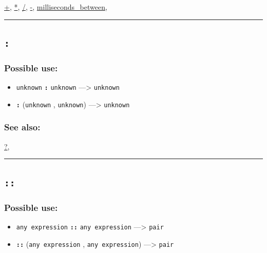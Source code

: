 \documentclass[]{book}
\providecommand{\tightlist}{%
  \setlength{\itemsep}{0pt}\setlength{\parskip}{0pt}}
\theoremstyle{definition}
\theoremstyle{definition}
\theoremstyle{definition}
\theoremstyle{remark}
\begin{document}
\href{operators-a-to-a.html\#+}{+}, \href{operators-a-to-a.html\#*}{*},
\href{operators-a-to-a.html\#/}{/}, \href{operators-a-to-a.html\#-}{-},
\href{operators-i-to-m.html\#milliseconds_between}{milliseconds\_between},

\begin{center}\rule{0.5\linewidth}{\linethickness}\end{center}

\subsection{\texorpdfstring{\texttt{:}}{:}}\label{section-1}

\subsubsection{Possible use:}\label{possible-use-1}

\begin{itemize}
\tightlist
\item
  \texttt{unknown} \textbf{\texttt{:}} \texttt{unknown}
  ---\textgreater{} \texttt{unknown}
\item
  \textbf{\texttt{:}} (\texttt{unknown} , \texttt{unknown})
  ---\textgreater{} \texttt{unknown}
\end{itemize}

\subsubsection{See also:}\label{see-also-1}

\href{operators-a-to-a.html\#?}{?},

\begin{center}\rule{0.5\linewidth}{\linethickness}\end{center}

\subsection{\texorpdfstring{\texttt{::}}{::}}\label{section-2}

\subsubsection{Possible use:}\label{possible-use-2}

\begin{itemize}
\tightlist
\item
  \texttt{any\ expression} \textbf{\texttt{::}} \texttt{any\ expression}
  ---\textgreater{} \texttt{pair}
\item
  \textbf{\texttt{::}} (\texttt{any\ expression} ,
  \texttt{any\ expression}) ---\textgreater{} \texttt{pair}
\end{itemize}
\end{document}
